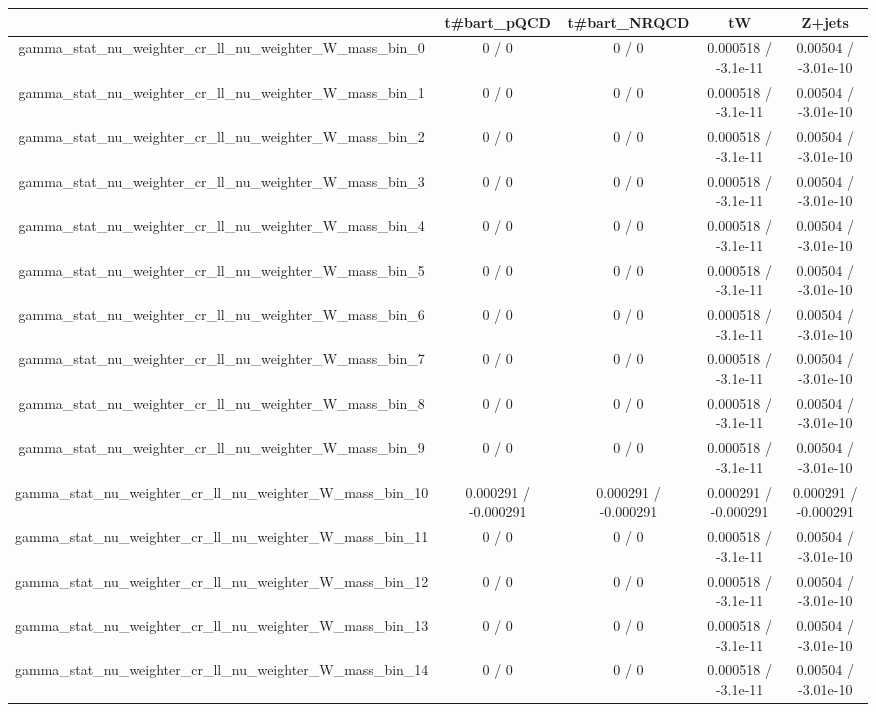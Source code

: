 \documentclass[10pt]{article}
\begin{document}
\begin{table}[htbp]
\begin{center}
\begin{tabular}{|c|c|c|c|c|}
\hline 
      & t#bar{t}_{pQCD}      & t#bar{t}_{NRQCD}      & tW      & Z+jets \\ 
\hline 
  gamma_stat_nu_weighter_cr_ll_nu_weighter_W_mass_bin_0 & 0 / 0 & 0 / 0 & 0.000518 / -3.1e-11 & 0.00504 / -3.01e-10 \\ 
  gamma_stat_nu_weighter_cr_ll_nu_weighter_W_mass_bin_1 & 0 / 0 & 0 / 0 & 0.000518 / -3.1e-11 & 0.00504 / -3.01e-10 \\ 
  gamma_stat_nu_weighter_cr_ll_nu_weighter_W_mass_bin_2 & 0 / 0 & 0 / 0 & 0.000518 / -3.1e-11 & 0.00504 / -3.01e-10 \\ 
  gamma_stat_nu_weighter_cr_ll_nu_weighter_W_mass_bin_3 & 0 / 0 & 0 / 0 & 0.000518 / -3.1e-11 & 0.00504 / -3.01e-10 \\ 
  gamma_stat_nu_weighter_cr_ll_nu_weighter_W_mass_bin_4 & 0 / 0 & 0 / 0 & 0.000518 / -3.1e-11 & 0.00504 / -3.01e-10 \\ 
  gamma_stat_nu_weighter_cr_ll_nu_weighter_W_mass_bin_5 & 0 / 0 & 0 / 0 & 0.000518 / -3.1e-11 & 0.00504 / -3.01e-10 \\ 
  gamma_stat_nu_weighter_cr_ll_nu_weighter_W_mass_bin_6 & 0 / 0 & 0 / 0 & 0.000518 / -3.1e-11 & 0.00504 / -3.01e-10 \\ 
  gamma_stat_nu_weighter_cr_ll_nu_weighter_W_mass_bin_7 & 0 / 0 & 0 / 0 & 0.000518 / -3.1e-11 & 0.00504 / -3.01e-10 \\ 
  gamma_stat_nu_weighter_cr_ll_nu_weighter_W_mass_bin_8 & 0 / 0 & 0 / 0 & 0.000518 / -3.1e-11 & 0.00504 / -3.01e-10 \\ 
  gamma_stat_nu_weighter_cr_ll_nu_weighter_W_mass_bin_9 & 0 / 0 & 0 / 0 & 0.000518 / -3.1e-11 & 0.00504 / -3.01e-10 \\ 
  gamma_stat_nu_weighter_cr_ll_nu_weighter_W_mass_bin_10 & 0.000291 / -0.000291 & 0.000291 / -0.000291 & 0.000291 / -0.000291 & 0.000291 / -0.000291 \\ 
  gamma_stat_nu_weighter_cr_ll_nu_weighter_W_mass_bin_11 & 0 / 0 & 0 / 0 & 0.000518 / -3.1e-11 & 0.00504 / -3.01e-10 \\ 
  gamma_stat_nu_weighter_cr_ll_nu_weighter_W_mass_bin_12 & 0 / 0 & 0 / 0 & 0.000518 / -3.1e-11 & 0.00504 / -3.01e-10 \\ 
  gamma_stat_nu_weighter_cr_ll_nu_weighter_W_mass_bin_13 & 0 / 0 & 0 / 0 & 0.000518 / -3.1e-11 & 0.00504 / -3.01e-10 \\ 
  gamma_stat_nu_weighter_cr_ll_nu_weighter_W_mass_bin_14 & 0 / 0 & 0 / 0 & 0.000518 / -3.1e-11 & 0.00504 / -3.01e-10 \\ 

\end{tabular}
\end{center}
\end{table}
\end{document}
